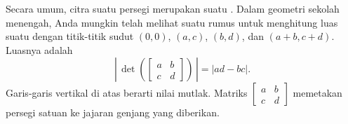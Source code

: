 \begin{myfig}
\capstart
{}
\caption{Citra persegi satuan melalui pemetaan
$A$.\label{linalg-imagesquare:fig}}
\end{myfig}

Secara umum, citra suatu persegi merupakan suatu .
Dalam geometri sekolah menengah, Anda mungkin telah melihat suatu rumus untuk
menghitung luas suatu 
dengan titik-titik sudut $(0,0)$, $(a,c)$, $(b,d)$,
dan $(a+b,c+d)$. Luasnya adalah
\begin{equation*}
\left\lvert \, \det \left(
\begin{bmatrix} a & b \\ c & d \end{bmatrix}
\right) \, \right\rvert
=
\lvert
a d - b c
\rvert
.
\end{equation*}
Garis-garis vertikal di atas berarti nilai mutlak.
Matriks $\left[ \begin{smallmatrix} a & b \\ c & d \end{smallmatrix}
\right]$
memetakan persegi satuan ke jajaran genjang yang diberikan.

\medskip

